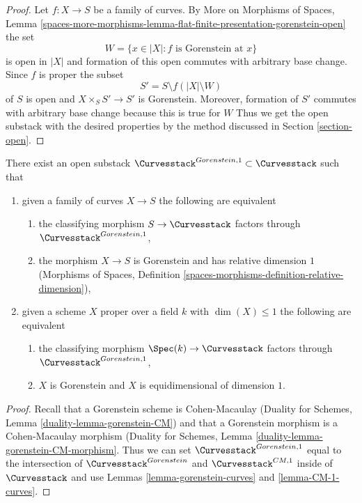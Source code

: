 \begin{proof}
Let $f : X \to S$ be a family of curves. By
More on Morphisms of Spaces, Lemma
\ref{spaces-more-morphisms-lemma-flat-finite-presentation-gorenstein-open}
the set
$$
W = \{x \in |X| : f \text{ is Gorenstein at }x\}
$$
is open in $|X|$ and formation of this open commutes with arbitrary
base change. Since $f$ is proper the subset
$$
S' = S \setminus f(|X| \setminus W)
$$
of $S$ is open and $X \times_S S' \to S'$ is Gorenstein.
Moreover, formation of $S'$ commutes with arbitrary base
change because this is true for $W$
Thus we get the open substack with the desired properties
by the method discussed in Section \ref{section-open}.
\end{proof}

\begin{lemma}
\label{lemma-gorenstein-1-curves}
There exist an open substack
$\Curvesstack^{Gorenstein, 1} \subset \Curvesstack$ such that
\begin{enumerate}
\item given a family of curves $X \to S$ the following are equivalent
\begin{enumerate}
\item the classifying morphism $S \to \Curvesstack$ factors
through $\Curvesstack^{Gorenstein, 1}$,
\item the morphism $X \to S$ is Gorenstein and has
relative dimension $1$ (Morphisms of Spaces, Definition
\ref{spaces-morphisms-definition-relative-dimension}),
\end{enumerate}
\item given a scheme $X$ proper over a field $k$ with $\dim(X) \leq 1$
the following are equivalent
\begin{enumerate}
\item the classifying morphism $\Spec(k) \to \Curvesstack$ factors
through $\Curvesstack^{Gorenstein, 1}$,
\item $X$ is Gorenstein and $X$ is equidimensional of
dimension $1$.
\end{enumerate}
\end{enumerate}
\end{lemma}

\begin{proof}
Recall that a Gorenstein scheme is Cohen-Macaulay
(Duality for Schemes, Lemma \ref{duality-lemma-gorenstein-CM})
and that
a Gorenstein morphism is a Cohen-Macaulay morphism
(Duality for Schemes, Lemma \ref{duality-lemma-gorenstein-CM-morphism}.
Thus we can set
$\Curvesstack^{Gorenstein, 1}$ equal to the intersection
of $\Curvesstack^{Gorenstein}$ and $\Curvesstack^{CM, 1}$
inside of $\Curvesstack$ and use
Lemmas \ref{lemma-gorenstein-curves} and \ref{lemma-CM-1-curves}.
\end{proof}






